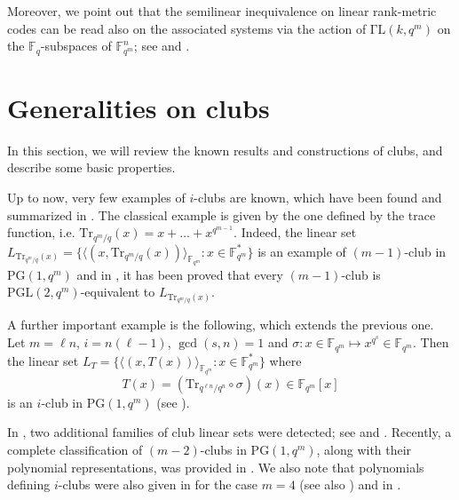 \documentclass[11pt]{amsart}
\theoremstyle{definition}
\newtheorem{construction}[theorem]{Construction}
\newcommand{\fqn}{\mathbb{F}_{q^n}}
\newcommand{\F}{{\mathbb F}}
\newcommand{\fq}{{\mathbb F}_{q}}
\newcommand{\la}{\langle}
\newcommand{\ra}{\rangle}
\newcommand{\PG}{\mathrm{PG}}
\newcommand{\fqm}{\mathbb{F}_{q^m}}
\begin{document}
Moreover, we point out that the semilinear inequivalence on linear rank-metric codes can be read also on the associated systems via the action of $\mathrm{\Gamma L}(k,q^m)$ on the $\fq$-subspaces of $\F_{q^m}^n$; see \cite{sheekeysurvey} and \cite{sheekeyVdV}.

\section{Generalities on clubs}\label{sec:genclubs}

In this section, we will review the known results and constructions of clubs, and describe some basic properties.

Up to now, very few examples of $i$-clubs are known, which have been found and summarized in \cite{de2016linear}. The classical example is given by the one defined by the trace function, i.e. $\mathrm{Tr}_{q^m/q}(x)=x+\ldots+x^{q^{m-1}}$. Indeed, the linear set $L_{\mathrm{Tr}_{q^m/q}(x)}=\{\la (x,\mathrm{Tr}_{q^m/q}(x))\ra_{\fqm} \colon x \in \fqm^*\}$ is an example of $(m-1)$-club in $\PG(1,q^m)$ and in \cite[Theorem 3.7]{csajbok2018classes}, it has been proved that every $(m-1)$-club is $\mathrm{PGL}(2,q^m)$-equivalent to $L_{\mathrm{Tr}_{q^m/q}(x)}$.

A further important example is the following, which extends the previous one. Let $m=\ell n$, $i=n(\ell-1)$, $\gcd(s,n)=1$ and $\sigma\colon x \in \fqm \mapsto x^{q^s} \in \fqm$. Then the linear set $L_T=\{\la (x,T(x))\ra_{\fqm} \colon x \in \fqm^*\}$ where 
\begin{equation}\label{eq:firstKMarc}
 T(x)=\left(\mathrm{Tr}_{q^{\ell n}/q^{n}}\circ\sigma\right)(x) \in \fqm[x]
\end{equation}
is an $i$-club in $\mathrm{PG}(1,q^{m})$ (see \cite[Theorem 3.3]{de2016linear}).

In \cite{de2016linear}, two additional families of club linear sets were detected; see \cite[Lemma 2.12]{de2016linear} and \cite[Lemma 3.6]{de2016linear}.
Recently, a complete classification of $(m-2)$-clubs in $\PG(1, q^m)$, along with their polynomial representations, was provided in \cite{napolitano2022clubs}.
We also note that polynomials defining $i$-clubs were also given in \cite[Corollary 5.5]{bartoli2022r} for the case $m = 4$ (see also \cite{csajbok2018maximum}) and in \cite[Corollary 6.3]{bartoli2022r}.



\end{document}

